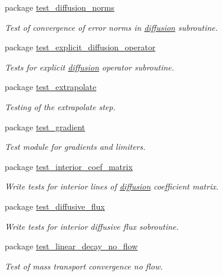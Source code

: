 \begin{CompactItemize}
\item 
package \hyperlink{a00081}{test\_\-diffusion\_\-norms}
\begin{CompactList}\small\item\em Test of convergence of error norms in \hyperlink{a00056}{diffusion} subroutine. \item\end{CompactList}

\item 
package \hyperlink{a00084}{test\_\-explicit\_\-diffusion\_\-operator}
\begin{CompactList}\small\item\em Tests for explicit \hyperlink{a00056}{diffusion} operator subroutine. \item\end{CompactList}

\item 
package \hyperlink{a00085}{test\_\-extrapolate}
\begin{CompactList}\small\item\em Testing of the extrapolate step. \item\end{CompactList}

\item 
package \hyperlink{a00086}{test\_\-gradient}
\begin{CompactList}\small\item\em Test module for gradients and limiters. \item\end{CompactList}

\item 
package \hyperlink{a00087}{test\_\-interior\_\-coef\_\-matrix}
\begin{CompactList}\small\item\em Write tests for interior lines of \hyperlink{a00056}{diffusion} coefficient matrix. \item\end{CompactList}

\item 
package \hyperlink{a00083}{test\_\-diffusive\_\-flux}
\begin{CompactList}\small\item\em Write tests for interior diffusive flux sobroutine. \item\end{CompactList}

\item 
package \hyperlink{a00089}{test\_\-linear\_\-decay\_\-no\_\-flow}
\begin{CompactList}\small\item\em Test of mass transport convergence no flow. \item\end{CompactList}


\end{CompactItemize}
